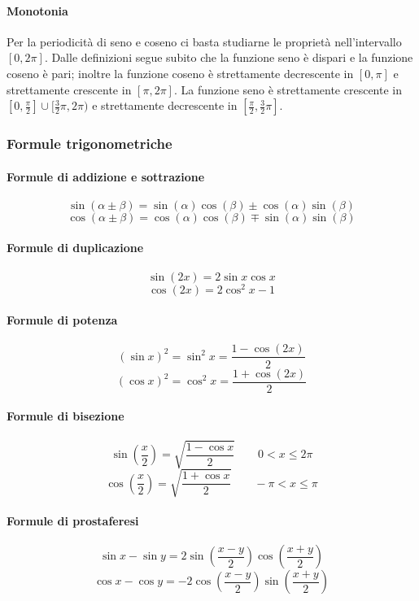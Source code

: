 \paragraph{Monotonia} Per la periodicità di seno e coseno ci basta studiarne le proprietà nell'intervallo $[0,2\pi]$. Dalle definizioni segue subito che la funzione seno è dispari e la funzione coseno è pari; inoltre la funzione coseno è strettamente decrescente in $[0,\pi]$ e strettamente crescente in $[\pi,2\pi]$. La funzione seno è strettamente crescente in $[0,\frac{\pi}{2}] \cup [\frac{3}{2}\pi,2\pi)$ e strettamente decrescente in $[\frac{\pi}{2},\frac{3}{2}\pi]$.

\begin{figure}[bth]
\myfloatalign
{} 
\end{figure}

\subsubsection{Formule trigonometriche}
\paragraph{Formule di addizione e sottrazione}
\[\sin(\alpha\pm\beta)=\sin(\alpha)\cos(\beta)\pm\cos(\alpha)\sin(\beta)\]
\[\cos(\alpha\pm\beta)=\cos(\alpha)\cos(\beta)\mp\sin(\alpha)\sin(\beta)\]
\paragraph{Formule di duplicazione}
\[\sin(2x)=2\sin x\cos x\]
\[\cos(2x)=2\cos^2 x - 1\]
\paragraph{Formule di potenza}
\[(\sin x)^2 = \sin^2 x= \frac{1-\cos(2x)}{2}\]
\[(\cos x)^2 = \cos^2 x= \frac{1+\cos(2x)}{2}\]
\paragraph{Formule di bisezione}
\[\sin(\frac{x}{2})=\sqrt{\frac{1-\cos x}{2}} \qquad 0<x\leq 2\pi\]
\[\cos(\frac{x}{2})=\sqrt{\frac{1+\cos x}{2}} \qquad -\pi<x\leq \pi\]
\paragraph{Formule di prostaferesi}
\[\sin x -\sin y=2\sin(\frac{x-y}{2})\cos(\frac{x+y}{2})\]
\[\cos x -\cos y=-2\cos(\frac{x-y}{2})\sin(\frac{x+y}{2})\]


